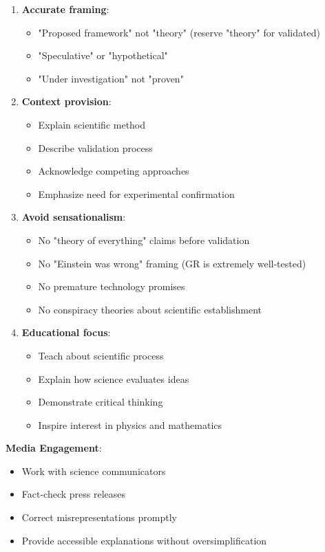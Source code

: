 \begin{enumerate}
    \item \textbf{Accurate framing}:
    \begin{itemize}
        \item "Proposed framework" not "theory" (reserve "theory" for validated)
        \item "Speculative" or "hypothetical"
        \item "Under investigation" not "proven"
    \end{itemize}

    \item \textbf{Context provision}:
    \begin{itemize}
        \item Explain scientific method
        \item Describe validation process
        \item Acknowledge competing approaches
        \item Emphasize need for experimental confirmation
    \end{itemize}

    \item \textbf{Avoid sensationalism}:
    \begin{itemize}
        \item No "theory of everything" claims before validation
        \item No "Einstein was wrong" framing (GR is extremely well-tested)
        \item No premature technology promises
        \item No conspiracy theories about scientific establishment
    \end{itemize}

    \item \textbf{Educational focus}:
    \begin{itemize}
        \item Teach about scientific process
        \item Explain how science evaluates ideas
        \item Demonstrate critical thinking
        \item Inspire interest in physics and mathematics
    \end{itemize}
\end{enumerate}

\textbf{Media Engagement}:
\begin{itemize}
    \item Work with science communicators
    \item Fact-check press releases
    \item Correct misrepresentations promptly
    \item Provide accessible explanations without oversimplification
\end{itemize}

